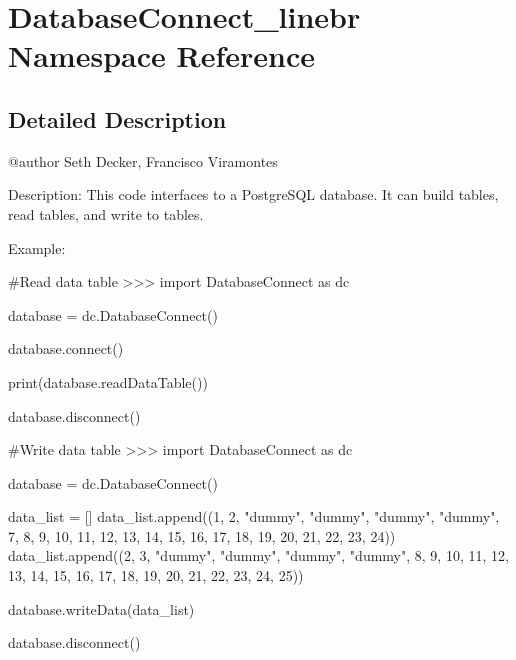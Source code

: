\hypertarget{namespaceDatabaseConnect__linebr}{}\section{Database\+Connect\+\_\+linebr Namespace Reference}
\label{namespaceDatabaseConnect__linebr}


\subsection{Detailed Description}
\begin{DoxyVerb}@author Seth Decker, Francisco Viramontes

Description: This code interfaces to a PostgreSQL database. It can build tables, 
read tables, and write to tables.


Example:

    #Read data table
>>> import DatabaseConnect as dc
    
    database = dc.DatabaseConnect()
    
    database.connect()
    
    print(database.readDataTable())
    
    database.disconnect()


    #Write data table
>>> import DatabaseConnect as dc
    
    database = dc.DatabaseConnect()

    data_list = []
    data_list.append((1, 2, "dummy", "dummy", "dummy", "dummy", 7, 8, 9, 10, 11, 12, 13, 14, 15, 16, 17, 18, 19, 20, 21, 22, 23, 24))  
    data_list.append((2, 3, "dummy", "dummy", "dummy", "dummy", 8, 9, 10, 11, 12, 13, 14, 15, 16, 17, 18, 19, 20, 21, 22, 23, 24, 25))

    database.writeData(data_list)

    database.disconnect()\end{DoxyVerb}
 